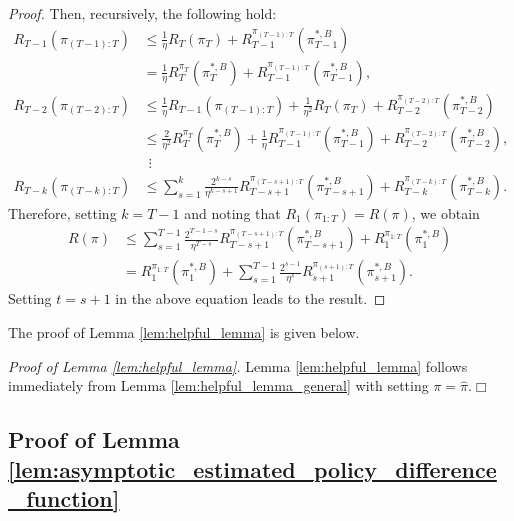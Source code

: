 \begin{proof}
Then, recursively, the following hold:
\begin{align*}
    R_{T-1}\left(\pi_{(T-1):T}\right) &\leq \frac{1}{\eta}R_{T}\left(\pi_{T}\right)+ R_{T-1}^{\pi_{(T-1):T}}(\pi_{T-1}^{\ast,B}) \\
    &= \frac{1}{\eta}R_{T}^{\pi_{T}}\left(\pi_{T}^{\ast,B}\right)+ R_{T-1}^{\pi_{(T-1):T}}(\pi_{T-1}^{\ast,B}), \\
    R_{T-2}\left(\pi_{(T-2):T}\right) &\leq \frac{1}{\eta}R_{T-1}\left(\pi_{(T-1):T}\right)+
    \frac{1}{\eta^2}R_{T}\left(\pi_{T}\right)+R_{T-2}^{\pi_{(T-2):T}}(\pi_{T-2}^{\ast,B}) \\
    &\leq \frac{2}{\eta^2}R_{T}^{\pi_{T}}\left(\pi_{T}^{\ast,B}\right) + \frac{1}{\eta}R_{T-1}^{\pi_{(T-1):T}}\left(\pi_{T-1}^{\ast,B}\right) +R_{T-2}^{\pi_{(T-2):T}}(\pi_{T-2}^{\ast,B}),\\
    & \ \ \vdots \\
R_{T-k}\left(\pi_{(T-k):T}\right) & \leq \sum_{s=1}^{k} \frac{2^{k-s}}{\eta^{k-s+1}} R_{T-s+1}^{\pi_{(T-s+1):T}}(\pi_{T-s+1}^{\ast,B}) + R_{T-k}^{\pi_{(T-k):T}}(\pi_{T-k}^{\ast,B}).
\end{align*}
Therefore, setting $k=T-1$ and noting that $R_{1}\left(\pi_{1:T}\right) = R(\pi)$, we obtain
\begin{align*}
    R(\pi) &\leq  \sum_{s=1}^{T-1} \frac{2^{T-1-s}}{\eta^{T-s}} R_{T-s+1}^{\pi_{(T-s+1):T}}(\pi_{T-s+1}^{\ast,B}) + R_{1}^{\pi_{1:T}}(\pi_{1}^{\ast,B}) \\
    & = R_{1}^{\pi_{1:T}}(\pi_{1}^{\ast,B}) + \sum_{s=1}^{T-1} \frac{2^{s-1}}{\eta^{s}} R_{s+1}^{\pi_{(s+1):T}}(\pi_{s+1}^{\ast,B}).
\end{align*}
Setting $t=s+1$ in the above equation leads to the result.
\end{proof}


\medskip

The proof of Lemma \ref{lem:helpful_lemma} is given below.

\bigskip
\noindent
\textit{Proof of Lemma \ref{lem:helpful_lemma}.}
Lemma \ref{lem:helpful_lemma} follows immediately from Lemma \ref{lem:helpful_lemma_general} with setting $\pi=\hat{\pi}$.\hfill {\large $\Box$}


\subsection{Proof of Lemma \ref{lem:asymptotic_estimated_policy_difference_function}}
\label{app:proof_of_main_lemma_2}

